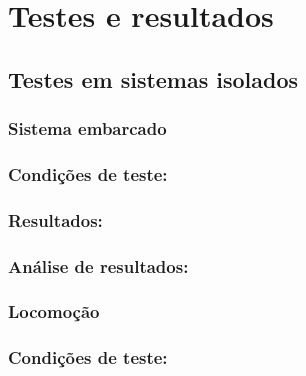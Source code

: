 
\chapter{Testes e resultados}\label{cap: Testes e resultados}

\section{\textbf{Testes em sistemas isolados}}

\subsection{Sistema embarcado}

    \subsection*{\textbf{Condições de teste:}}

    \subsection*{\textbf{Resultados:}}  

    \subsection*{\textbf{Análise de resultados:}}

\subsection{Locomoção}

\subsection*{\textbf{Condições de teste:}}

